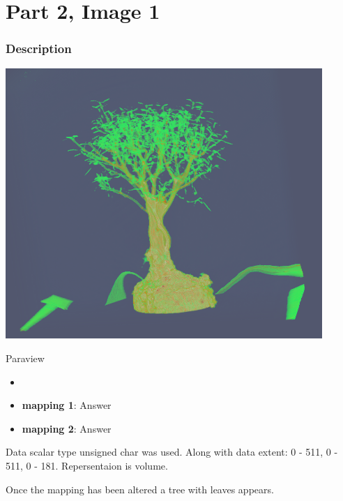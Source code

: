 \hypertarget{part-2-image-1}{%
\section{Part 2, Image 1}\label{part-1-design-2}}

\centering


\hypertarget{description}{%
	\subsubsection{Description}\label{description}}

\begin{description}
	\item[Image:]
	\item\includegraphics[width=12cm]{Tree1.png}

	\item[Tool:] Paraview
	\item[Visual Mappings:]
	\begin{itemize}
		\tightlist
		\item[ ]
	\end{itemize}
	\begin{itemize}
		\tightlist
		\item
		\textbf{mapping 1}: Answer
	\end{itemize}
	
	\begin{itemize}
		\tightlist
		\item
		\textbf{mapping 2}: Answer
	\end{itemize}
	\item[Data Conversion:] Data scalar type unsigned char was used. Along with data extent: 0 - 511, 0 - 511, 0 - 181. Repersentaion is volume.
	\item[Unique Observation:]
	Once the mapping has been altered a tree with leaves appears.
\end{description}